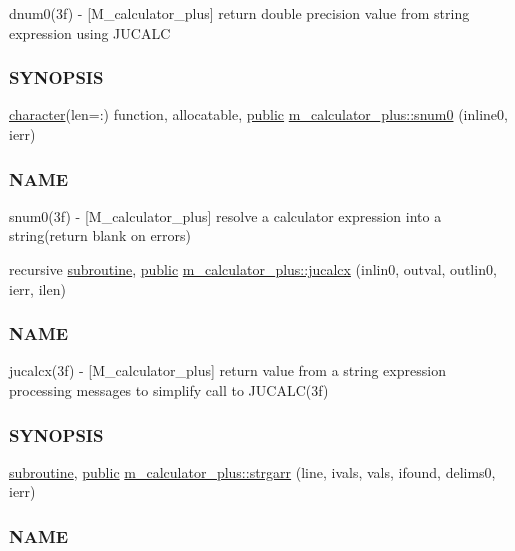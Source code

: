 \begin{DoxyCompactItemize}
\begin{DoxyCompactList}
dnum0(3f) -\/ \mbox{[}M\+\_\+calculator\+\_\+plus\mbox{]} return double precision value from string expression using J\+U\+C\+A\+LC \subsubsection*{S\+Y\+N\+O\+P\+S\+IS}\end{DoxyCompactList}\item 
\hyperlink{option__stopwatch_83_8txt_abd4b21fbbd175834027b5224bfe97e66}{character}(len=\+:) function, allocatable, \hyperlink{M__stopwatch_83_8txt_a2f74811300c361e53b430611a7d1769f}{public} \hyperlink{namespacem__calculator__plus_a2538e7f9f0b810f7f8dbdd80fa2444b3}{m\+\_\+calculator\+\_\+plus\+::snum0} (inline0, ierr)
\begin{DoxyCompactList}\small\item\em \subsubsection*{N\+A\+ME}

snum0(3f) -\/ \mbox{[}M\+\_\+calculator\+\_\+plus\mbox{]} resolve a calculator expression into a string(return blank on errors) \end{DoxyCompactList}\item 
recursive \hyperlink{M__stopwatch_83_8txt_acfbcff50169d691ff02d4a123ed70482}{subroutine}, \hyperlink{M__stopwatch_83_8txt_a2f74811300c361e53b430611a7d1769f}{public} \hyperlink{namespacem__calculator__plus_ac6f5a1bd3d8be798af932c006a72b123}{m\+\_\+calculator\+\_\+plus\+::jucalcx} (inlin0, outval, outlin0, ierr, ilen)
\begin{DoxyCompactList}\small\item\em \subsubsection*{N\+A\+ME}

jucalcx(3f) -\/ \mbox{[}M\+\_\+calculator\+\_\+plus\mbox{]} return value from a string expression processing messages to simplify call to J\+U\+C\+A\+L\+C(3f) \subsubsection*{S\+Y\+N\+O\+P\+S\+IS}\end{DoxyCompactList}\item 
\hyperlink{M__stopwatch_83_8txt_acfbcff50169d691ff02d4a123ed70482}{subroutine}, \hyperlink{M__stopwatch_83_8txt_a2f74811300c361e53b430611a7d1769f}{public} \hyperlink{namespacem__calculator__plus_a4d3424e0cb74d4af53e7f59c07d31f1b}{m\+\_\+calculator\+\_\+plus\+::strgarr} (line, ivals, vals, ifound, delims0, ierr)
\begin{DoxyCompactList}\small\item\em \subsubsection*{N\+A\+ME}


\end{DoxyCompactList}
\end{DoxyCompactItemize}
